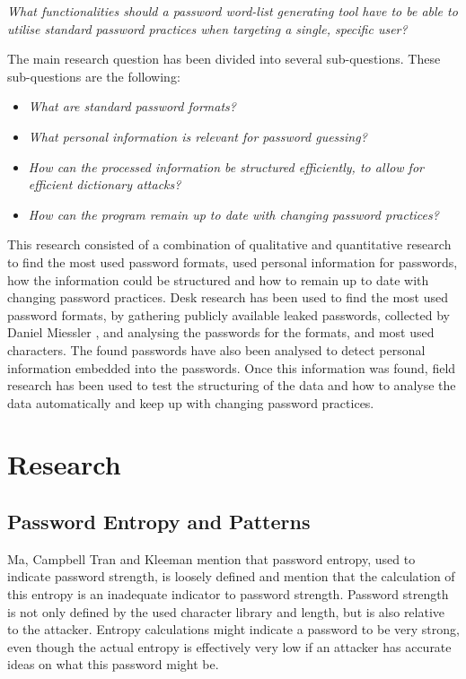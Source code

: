 \documentclass[a4paper,12pt]{article}
\begin{document}
\textit{What functionalities should a password word-list generating tool have to be able to utilise standard password practices when targeting a single, specific user?}

The main research question has been divided into several sub-questions. These sub-questions are the following:

\begin{itemize}
\item \textit{What are standard password formats?}
\item \textit{What personal information is relevant for password guessing?}
\item \textit{How can the processed information be structured efficiently, to allow for efficient dictionary attacks?}
\item \textit{How can the program remain up to date with changing password practices?}
\end{itemize}

This research consisted of a combination of qualitative and quantitative research to find the most used password formats, used personal information for passwords, how the information could be structured and how to remain up to date with changing password practices. Desk research has been used to find the most used password formats, by gathering publicly available leaked passwords, collected by Daniel Miessler \cite{bib:seclists}, and analysing the passwords for the formats, and most used characters. The found passwords have also been analysed to detect personal information embedded into the passwords. Once this information was found, field research has been used to test the structuring of the data and how to analyse the data automatically and keep up with changing password practices.

\newpage
\section{Research}

\subsection{Password Entropy and Patterns}
Ma, Campbell Tran and Kleeman \cite{bib:entro} mention that password entropy, used to indicate password strength, is loosely defined and mention that the calculation of this entropy is an inadequate indicator to password strength. Password strength is not only defined by the used character library and length, but is also relative to the attacker. Entropy calculations might indicate a password to be very strong, even though the actual entropy is effectively very low if an attacker has accurate ideas on what this password might be.\\
\end{document}
